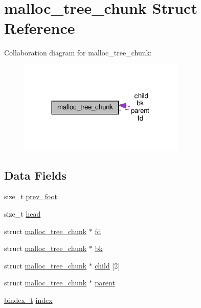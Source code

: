 \hypertarget{structmalloc__tree__chunk}{}\section{malloc\+\_\+tree\+\_\+chunk Struct Reference}
\label{structmalloc__tree__chunk}


Collaboration diagram for malloc\+\_\+tree\+\_\+chunk\+:\nopagebreak
\begin{figure}[H]
\begin{center}
\leavevmode
\includegraphics[width=224pt]{structmalloc__tree__chunk__coll__graph}
\end{center}
\end{figure}
\subsection*{Data Fields}
\begin{DoxyCompactItemize}
\item 
size\+\_\+t \hyperlink{structmalloc__tree__chunk_a0b7e321702857b18f5013a3182b99262}{prev\+\_\+foot}
\item 
size\+\_\+t \hyperlink{structmalloc__tree__chunk_a1737b1a78f4bfbf0047210e3f3fd014d}{head}
\item 
struct \hyperlink{structmalloc__tree__chunk}{malloc\+\_\+tree\+\_\+chunk} $\ast$ \hyperlink{structmalloc__tree__chunk_a5584ad2f70ef7ad1a5eb5f55820e3fe9}{fd}
\item 
struct \hyperlink{structmalloc__tree__chunk}{malloc\+\_\+tree\+\_\+chunk} $\ast$ \hyperlink{structmalloc__tree__chunk_a862e6cafa961c1f63d4b10d67480cba0}{bk}
\item 
struct \hyperlink{structmalloc__tree__chunk}{malloc\+\_\+tree\+\_\+chunk} $\ast$ \hyperlink{structmalloc__tree__chunk_a560fa0afc644c1e05f4fab62818ab6cd}{child} \mbox{[}2\mbox{]}
\item 
struct \hyperlink{structmalloc__tree__chunk}{malloc\+\_\+tree\+\_\+chunk} $\ast$ \hyperlink{structmalloc__tree__chunk_ae15ae9af5d9c57488718f0649868b7fe}{parent}
\item 
\hyperlink{dl__malloc_8c_a4c04048d19db75c080e5f0ab19d45f8f}{bindex\+\_\+t} \hyperlink{structmalloc__tree__chunk_a3015f2a8d6cc5cdb7abaf34e902c46a4}{index}
\end{DoxyCompactItemize}


